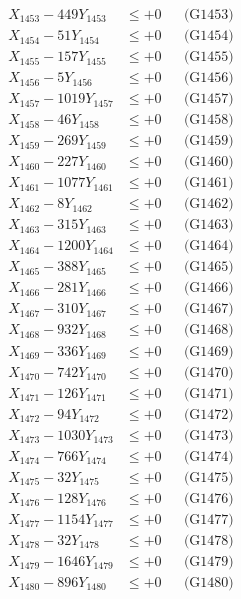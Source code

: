 \documentclass[a4paper,10pt]{article}
\begin{document}
{\begin{align}
X_{1453} - 449Y_{1453} &\leq +0 && \text{(G1453)} \\
X_{1454} - 51Y_{1454} &\leq +0 && \text{(G1454)} \\
X_{1455} - 157Y_{1455} &\leq +0 && \text{(G1455)} \\
X_{1456} - 5Y_{1456} &\leq +0 && \text{(G1456)} \\
X_{1457} - 1019Y_{1457} &\leq +0 && \text{(G1457)} \\
X_{1458} - 46Y_{1458} &\leq +0 && \text{(G1458)} \\
X_{1459} - 269Y_{1459} &\leq +0 && \text{(G1459)} \\
X_{1460} - 227Y_{1460} &\leq +0 && \text{(G1460)} \\
\allowbreak
X_{1461} - 1077Y_{1461} &\leq +0 && \text{(G1461)} \\
X_{1462} - 8Y_{1462} &\leq +0 && \text{(G1462)} \\
X_{1463} - 315Y_{1463} &\leq +0 && \text{(G1463)} \\
X_{1464} - 1200Y_{1464} &\leq +0 && \text{(G1464)} \\
X_{1465} - 388Y_{1465} &\leq +0 && \text{(G1465)} \\
X_{1466} - 281Y_{1466} &\leq +0 && \text{(G1466)} \\
X_{1467} - 310Y_{1467} &\leq +0 && \text{(G1467)} \\
X_{1468} - 932Y_{1468} &\leq +0 && \text{(G1468)} \\
X_{1469} - 336Y_{1469} &\leq +0 && \text{(G1469)} \\
X_{1470} - 742Y_{1470} &\leq +0 && \text{(G1470)} \\
\allowbreak
X_{1471} - 126Y_{1471} &\leq +0 && \text{(G1471)} \\
X_{1472} - 94Y_{1472} &\leq +0 && \text{(G1472)} \\
X_{1473} - 1030Y_{1473} &\leq +0 && \text{(G1473)} \\
X_{1474} - 766Y_{1474} &\leq +0 && \text{(G1474)} \\
X_{1475} - 32Y_{1475} &\leq +0 && \text{(G1475)} \\
X_{1476} - 128Y_{1476} &\leq +0 && \text{(G1476)} \\
X_{1477} - 1154Y_{1477} &\leq +0 && \text{(G1477)} \\
X_{1478} - 32Y_{1478} &\leq +0 && \text{(G1478)} \\
X_{1479} - 1646Y_{1479} &\leq +0 && \text{(G1479)} \\
X_{1480} - 896Y_{1480} &\leq +0 && \text{(G1480)} \\

\end{align}}
\end{document}
